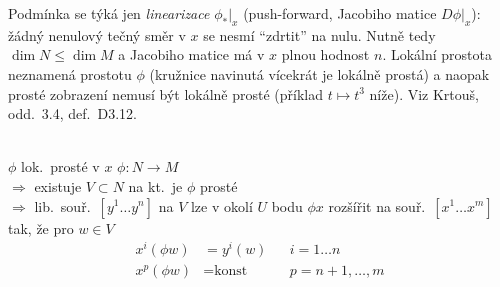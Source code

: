 \begin{vysvetleni}
Podmínka se týká jen \emph{linearizace} $\phi_*|_x$ (push-forward, Jacobiho matice $D\phi|_x$): žádný nenulový tečný směr v $x$ se nesmí ``zdrtit'' na nulu. Nutně tedy $\dim N\leq\dim M$ a Jacobiho matice má v $x$ plnou hodnost $n$. Lokální prostota neznamená prostotu $\phi$ (kružnice navinutá vícekrát je lokálně prostá) a naopak prosté zobrazení nemusí být lokálně prosté (příklad $t\mapsto t^3$ níže). Viz Krtouš, odd.\ 3.4, def.\ D3.12.
\end{vysvetleni}

\begin{veta}
 \\
$\phi$ lok.\ prosté v $x$ \qquad $\phi: N\to M$ \\
$\Rightarrow$ existuje $V\subset N$ na kt.\ je $\phi$ prosté \\
$\Rightarrow$ lib.\ souř.\ $[y^1\dots y^n]$ na $V$ lze v okolí $U$ bodu $\phi x$ rozšířit na souř.\ $[x^1\dots x^m]$ tak, že pro $w\in V$
\begin{align*}
  x^i(\phi w) &= y^i(w) && i = 1\dots n \\
  x^p(\phi w) &= \text{konst} && p = n+1,\dots,m
\end{align*}
\end{veta}

\begin{center}
\end{center}

